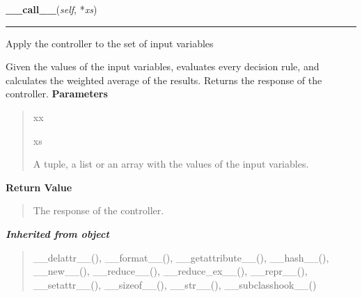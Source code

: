     \label{peach:fuzzy:control:Parametric:__call__}

    \vspace{0.5ex}

\hspace{.8\funcindent}\begin{boxedminipage}{\funcwidth}

    \raggedright \textbf{\_\_call\_\_}(\textit{self}, *\textit{xs})

    \vspace{-1.5ex}

    \rule{\textwidth}{0.5\fboxrule}
\setlength{\parskip}{2ex}

Apply the controller to the set of input variables

Given the values of the input variables, evaluates every decision rule,
and calculates the weighted average of the results. Returns the response
of the controller.
\setlength{\parskip}{1ex}
      \textbf{Parameters}
      \vspace{-1ex}

      \begin{quote}
        \begin{Ventry}{xx}

          \item[xs]


A tuple, a list or an array with the values of the input variables.
        \end{Ventry}

      \end{quote}

      \textbf{Return Value}
    \vspace{-1ex}

      \begin{quote}

The response of the controller.
      \end{quote}

    \end{boxedminipage}


\large{\textbf{\textit{Inherited from object}}}

\begin{quote}
\_\_delattr\_\_(), \_\_format\_\_(), \_\_getattribute\_\_(), \_\_hash\_\_(), \_\_new\_\_(), \_\_reduce\_\_(), \_\_reduce\_ex\_\_(), \_\_repr\_\_(), \_\_setattr\_\_(), \_\_sizeof\_\_(), \_\_str\_\_(), \_\_subclasshook\_\_()
\end{quote}

